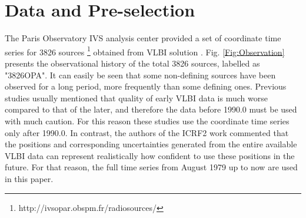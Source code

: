 \documentclass{aa}
\begin{document}
\section{Data and Pre-selection}\label{sect:preselection}
The Paris Observatory IVS analysis center provided a set of coordinate time series for 3826 sources 
\footnote{http://ivsopar.obspm.fr/radiosources/} obtained from VLBI solution \citep[see][Sect.~2 for details]{Lambert2013}.  Fig. \ref{Fig:Observation} presents the observational history of the total 3826 sources, labelled as "3826OPA". It can easily be seen that some non-defining sources have been observed for a long period, more frequently than some defining ones. Previous studies \citep[for example]{Lambert2009} usually mentioned that quality of early VLBI data is much worse compared to that of the later, and therefore the data before 1990.0 must be used with much caution. For this reason these studies use the coordinate time series only after 1990.0. In contrast, the authors of the ICRF2 work commented that the positions and corresponding uncertainties generated from the entire available VLBI data can represent realistically how confident to use these positions in the future. For that reason, the full time series from August 1979 up to now are used in this paper.
\end{document}
